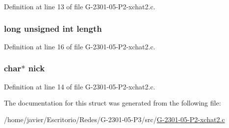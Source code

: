 Definition at line 13 of file G-\/2301-\/05-\/\-P2-\/xchat2.\-c.

\hypertarget{structthread_send_args_a90bf0058c728d7cea7de336a1251f387}{
\subsubsection[{length}]{\setlength{\rightskip}{0pt plus 5cm}long unsigned int length}}\label{structthread_send_args_a90bf0058c728d7cea7de336a1251f387}


Definition at line 16 of file G-\/2301-\/05-\/\-P2-\/xchat2.\-c.

\hypertarget{structthread_send_args_a89f27568c92a418413e6b37b41f07e21}{
\subsubsection[{nick}]{\setlength{\rightskip}{0pt plus 5cm}char$\ast$ nick}}\label{structthread_send_args_a89f27568c92a418413e6b37b41f07e21}


Definition at line 14 of file G-\/2301-\/05-\/\-P2-\/xchat2.\-c.



The documentation for this struct was generated from the following file\-:\begin{DoxyCompactItemize}
\item 
/home/javier/\-Escritorio/\-Redes/\-G-\/2301-\/05-\/\-P3/src/\hyperlink{_g-2301-05-_p2-xchat2_8c}{G-\/2301-\/05-\/\-P2-\/xchat2.\-c}\end{DoxyCompactItemize}
